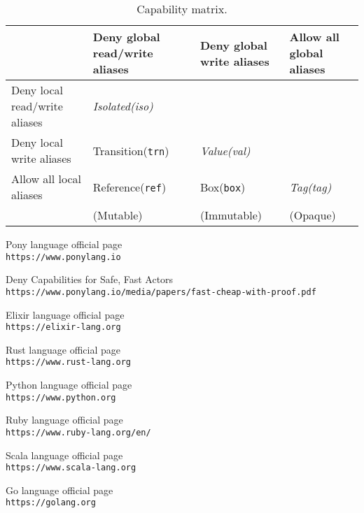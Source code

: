 \documentclass{article}
\begin{document}
\begin{table}[]
\begin{tabularx}{\textwidth}{|X|X|X|X|}
 \hline
 & Deny global read/write aliases & Deny global write aliases & Allow all global aliases \\  \hline
Deny local read/write aliases & \textit{Isolated(iso) }    &                           &                        \\  \hline
Deny local write aliases      & Transition(\texttt{trn})                & \textit{Value(val)  }              &                        \\  \hline
Allow all local aliases       & Reference(\texttt{ref})                 & Box(\texttt{box})                  & \textit{Tag(tag)  }             \\  \hline
                              & (Mutable)                      & (Immutable)               & (Opaque)   \\ \hline           
\end{tabularx}
\caption{Capability matrix. }
\end{table}



\begin{thebibliography}{9}
Pony language official page
\\\texttt{https://www.ponylang.io}

Deny Capabilities for Safe, Fast Actors
\\\texttt{https://www.ponylang.io/media/papers/fast-cheap-with-proof.pdf}

Elixir language official page
\\\texttt{https://elixir-lang.org}

Rust language official page
\\\texttt{https://www.rust-lang.org}

Python language official page
\\\texttt{https://www.python.org}

Ruby language official page
\\\texttt{https://www.ruby-lang.org/en/}
	
Scala language official page
\\\texttt{https://www.scala-lang.org}

Go language official page
\\\texttt{https://golang.org}
	
	
\end{thebibliography}
\end{document}

